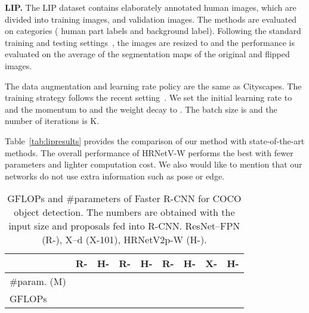\documentclass[10pt,twocolumn,letterpaper]{article}
\begin{document}
\vspace{.1cm}
\noindent\textbf{LIP.}
The LIP dataset \cite{GongLSL17}
contains  elaborately annotated human images,
which are divided into  training images,
and  validation images. The methods are evaluated on
 categories ( human part labels and
 background label).
Following the standard training and testing settings~\cite{TL18}, the images are resized to  and
the performance is evaluated
on the average of the segmentation maps of the original and flipped images.

The data augmentation and learning rate policy are the same as Cityscapes.
The training strategy follows the recent setting~\cite{TL18}.
We set the initial learning rate to  and
the momentum to  and the weight decay to .
The batch size is  and the number of iterations is K.

Table~\ref{tab:lipresults}
provides the comparison of our method
with state-of-the-art methods.
The overall performance of HRNetV-W
performs the best
with fewer parameters and lighter computation cost.
We also would like to mention that
our networks do not use extra information such as pose or edge.

\renewcommand{\arraystretch}{1.3}
	\begin{table}[t]
	    \centering\setlength{\tabcolsep}{2.9pt}
	    \scriptsize
	    \caption{GFLOPs and \#parameters
	    of Faster R-CNN for COCO object detection.
	    The numbers are obtained
	    with the input size 
	    and
	     proposals fed into R-CNN.
	    ResNet--FPN (R-),
	    X--d (X-101),
	    HRNetV2p-W (H-).
	    }
	    \label{tab:det_training_comparision}
	    \begin{tabular}{l|rr|rr|rr|rr}
	        \hline \noalign{\smallskip}
	        ~ & R- & H-& R- &H-& R- &H- & X- & H-\\
	        \hline
	
	        \hline
	        \#param. (M) &  &  &  &  &  &  &  &  \\
	        GFLOPs &  &  &  &  &  &  &  &  \\
	        \hline
	    \end{tabular}
	\end{table}
\end{document}
